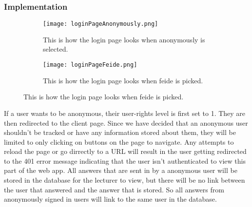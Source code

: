 \subsubsection{Implementation}
\begin{figure}[h]
    \centering
    \begin{subfigure}{0.45\linewidth}
        \texttt{[image: loginPageAnonymously.png]}
        \caption{This is how the login page looks when anonymously is selected.}
        \label{fig:loginPageAnonoumsly}
    \end{subfigure}
    \begin{subfigure}{0.45\linewidth}
        \texttt{[image: loginPageFeide.png]}
        \caption{This is how the login page looks when feide is picked.}
        \label{fig:loginPageFeide}
    \end{subfigure}
\end{figure}
\noindent
If a user wants to be anonymous, their user-rights level is first set to 1. They are then redirected to the client page. Since we have decided that an anonymous user shouldn't be tracked or have any information stored about them, they will be limited to only clicking on buttons on the page to navigate. Any attempts to reload the page or go dirrectly to a URL will result in the user getting redirected to the 401 error message indicating that the user isn't authenticated to view this part of the web app. All answers that are sent in by a anonymous user will be stored in the database for the lecturer to view, but there will be no link between the user that answered and the answer that is stored. So all answers from anonymously signed in users will link to the same user in the database.
\\[11pt]
